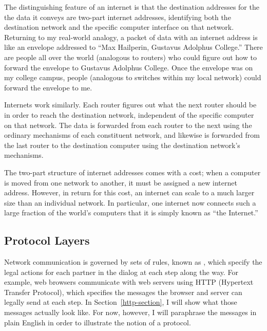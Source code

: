 The distinguishing feature of an internet is that the destination
addresses for the the data it conveys are two-part internet addresses,
identifying both the destination network and the specific computer
interface on that network.  Returning to my real-world analogy, a
packet of data with an internet address is like an envelope addressed
to ``Max Hailperin, Gustavus Adolphus College.''  There are people all
over the world (analogous to routers) who could figure out how to
forward the envelope to Gustavus Adolphus College.  Once the envelope
was on my college campus, people (analogous to switches within my local
network) could forward the envelope to me.

Internets work similarly.  Each router figures out what the next
router should be in order to reach the destination network,
independent of the specific computer on that network.  The data is
forwarded from each router to the next using the ordinary mechanisms
of each constituent network, and likewise is forwarded from the last
router to the destination computer using the destination network's
mechanisms.

The two-part structure of internet addresses comes with a cost; when a
computer is moved from one network to another, it
must be assigned a new internet address.  However, in return for this
cost, an internet can scale to a much larger
size than an individual network.  In particular, one internet now
connects such a large fraction of the world's computers that it is
simply known as ``the Internet.''

\subsection{Protocol Layers}\label{protocol-layers-sections}

Network communication is governed by sets of rules, known as
, which specify the legal actions for each partner in
the dialog at each step along the way.  For example, web browsers
communicate with web servers using HTTP (Hypertext Transfer Protocol),
which specifies the messages the browser and server can legally send
at each step.  In Section~\ref{http-section}, I will show what those
messages actually look like.  For now, however, I will paraphrase the
messages in plain English in order to illustrate the notion of a
protocol.

